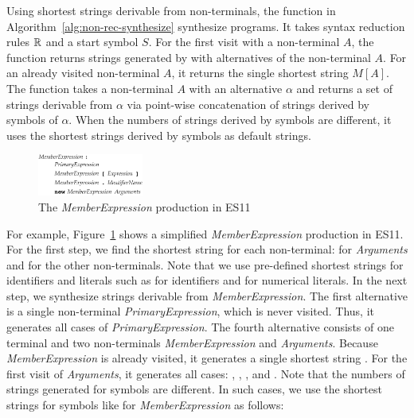 Using shortest strings derivable from non-terminals, 
the  function in Algorithm~\ref{alg:non-rec-synthesize}
synthesize programs.  It takes syntax reduction rules $\mathbb{R}$ and a start symbol $S$.
For the first visit with a non-terminal $A$, the  function returns
strings generated by  with alternatives of the non-terminal $A$.
For an already visited non-terminal $A$, it returns the single shortest string $M[A]$.
The  function takes a non-terminal $A$ with an alternative
$\alpha$ and returns a set of strings derivable from $\alpha$ via
point-wise concatenation of strings derived by symbols of $\alpha$.
When the numbers of strings derived by symbols are different,
it uses the shortest strings derived by symbols as default strings.

\begin{figure}[t]
  \centering
  \includegraphics[width=0.31\textwidth]{img/syntax-member}
  \caption{The \textit{MemberExpression} production in ES11}
  \label{fig:prod-example}
  \vspace*{-1em}
\end{figure}

For example, Figure~\ref{fig:prod-example} shows a simplified
\textit{MemberExpression} production in ES11.  For the first step, we find
the shortest string for each non-terminal: \code{()} for \textit{Arguments} and
 for the other non-terminals.  Note that we use pre-defined shortest
strings for identifiers and literals such as  for identifiers and
 for numerical literals.  In the next step, we synthesize strings
derivable from \textit{MemberExpression}.  The first alternative is a
single non-terminal \textit{PrimaryExpression}, which is never visited.
Thus, it generates all cases of \textit{PrimaryExpression}.  The fourth
alternative consists of one terminal  and two non-terminals
\textit{MemberExpression} and \textit{Arguments}.  Because \textit{MemberExpression}
is already visited, it generates a single shortest string .
For the first visit of \textit{Arguments}, it generates all cases:
\code{()}, , , and .
Note that the numbers of strings generated for symbols are different.
In such cases, we use the shortest strings for symbols like
 for \textit{MemberExpression} as follows:

